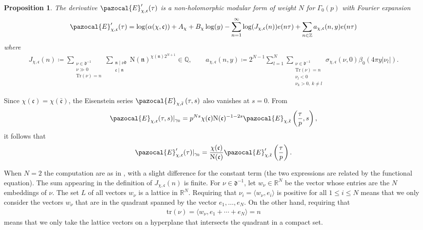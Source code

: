 \documentclass[twoside,a4paper,10pt]{article} %
\newcommand{\8}{\infty}
\newcommand{\Z}{\mathbb{Z}}
\newcommand{\R}{\mathbb{R}}
\newcommand{\Q}{\mathbb{Q}}
\newcommand{\nfrak}{\mathfrak{n}}
\newcommand{\dfrak}{\mathfrak{d}}
\newcommand{\cfrak}{\mathfrak{c}}
\newcommand{\Tr}{\mathrm{Tr}}
\newcommand{\tr}{\mathrm{tr}}
\newcommand{\N}{\mathrm{N}}
\newcommand{\Ecal}{\pazocal{E}}
\theoremstyle{mytheoremstyle}
\newtheorem{prop}[thm]{Proposition}
\theoremstyle{remark}
\numberwithin{equation}{section}
\begin{document}
\begin{prop} \label{Gchifourier}The derivative $\Ecal'_{\chi,\cfrak}(\tau)$ is a non-holomorphic modular form of weight $N$ for $\Gamma_0(p)$ with Fourier expansion
\begin{align}
\Ecal'_{\chi,\cfrak}(\tau)= \log(\alpha(\chi,\cfrak))+A_{\chi}+B_{\chi}\log(y)-\sum_{n=1}^\8\log(J_{\chi,\cfrak}(n))e(n \tau)  + \sum_{n \in \Z} a_{\chi,\cfrak}(n,y)e(n \tau)
\end{align}
where
\begin{align}
J_{\chi,\cfrak}(n) \coloneqq \sum_{\substack{\nu \in \dfrak^{-1} \\ \nu \gg 0 \\ \Tr(\nu)=n}}\sum_{\substack{\nfrak \mid \nu \dfrak \\ \cfrak \mid \nfrak }} \N(\nfrak)^{\chi(\nfrak)2^{N+1}} \in \Q, \qquad 
a_{\chi,\cfrak}(n,y) \coloneqq 2^{N-1}\sum_{l=1}^N \sum_{\substack{\nu \in \dfrak^{-1} \\ \Tr(\nu)=n \\ \nu_l<0 \\ \nu_k>0, \ k \neq l}}\sigma_{\chi,\cfrak}(\nu,0)\beta_0(4\pi y \vert \nu_l \vert).
\end{align}
\end{prop}
Since $\chi(\cfrak)=\chi(\bar{\cfrak})$, the Eisenstein series $\Ecal_{\chi,\bar{\cfrak}}\left (\tau,s \right )$ also vanishes at $s=0$. From 
\begin{align}
\Ecal_{\chi,\cfrak}(\tau,s) \vert_{\gamma_0}=p^{Ns}\chi(\cfrak)\N(\cfrak)^{-1-2s}\Ecal_{\chi,\bar{\cfrak}}\left (\frac{\tau}{p},s \right ),
\end{align} it follows that
\begin{align}
\Ecal'_{\chi,\cfrak}(\tau)\vert_{\gamma_0}=\frac{\chi(\cfrak)}{\N(\cfrak)}\Ecal'_{\chi,\bar{\cfrak}}\left (\frac{\tau}{p} \right ).
\end{align}

When $N=2$ the computation are as in \cite{gzsing}, with a slight difference for the constant term (the two expressions are related by the functional equation). The sum appearing in the definition of $J_{\chi,\cfrak}(n)$ is finite. For $\nu \in \dfrak^{-1}$, let $w_\nu \in \R^N$ be the vector whose entries are the $N$ embeddings of $\nu$. The set $L$ of all vectors $w_\nu$ is a lattice in $\R^N$. Requiring that $\nu_i=\langle w_\nu,e_i \rangle$ is positive for all $1 \leq i \leq N$ means that we only consider the vectors $w_\nu$ that are in the quadrant spanned by the vector $e_1, \dots,e_N$. On the other hand, requiring that 
\begin{align}
\tr(\nu)=\langle w_\nu,e_1+\cdots+e_N \rangle=n
\end{align} means that we only take the lattice vectors on a hyperplane that intersects the quadrant in a compact set. 
\end{document}
